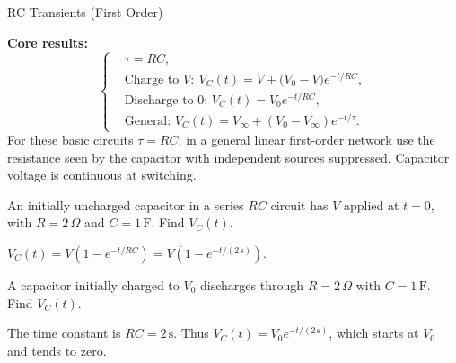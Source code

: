 \begin{KnowledgePoint}{RC Transients (First Order) \Core}
  \KPFormulas
  \begin{formulabox}
  \textbf{Core results:}
  \[
  \left\{\begin{aligned}
    &\tau=RC,\\
    &\text{Charge to }V:\ V_C(t)=V+\big(V_0-V\big)e^{-t/RC},\\
    &\text{Discharge to 0: } V_C(t)=V_0 e^{-t/RC},\\
    &\text{General: } V_C(t)=V_\infty+(V_0-V_\infty)e^{-t/\tau}.
  \end{aligned}\right.
  \]
  For these basic circuits $\tau=RC$; in a general linear first-order network use the resistance seen by the capacitor with independent sources suppressed. Capacitor voltage is continuous at switching.
  \end{formulabox}

  \KPProblems
  \begin{cheatproblem}
  An initially uncharged capacitor in a series $RC$ circuit has $V$ applied at $t=0$, with $R=2\,\Omega$ and $C=1\,\text{F}$. Find $V_C(t)$.
  \begin{solutionbox}
  $V_C(t)=V(1-e^{-t/RC})=V(1-e^{-t/(2\,\mathrm s)})$.
  \end{solutionbox}
  \end{cheatproblem}
\begin{cheatproblem}
  A capacitor initially charged to $V_0$ discharges through $R=2\,\Omega$ with $C=1\,\mathrm F$. Find $V_C(t)$.
  \begin{solutionbox}
    The time constant is $RC=2\,\mathrm s$. Thus $V_C(t)=V_0e^{-t/(2\,\mathrm s)}$, which starts at $V_0$ and tends to zero.
  \end{solutionbox}
\end{cheatproblem}
\end{KnowledgePoint}



